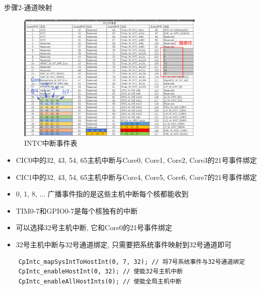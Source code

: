 \documentclass[10pt]{ctexbeamer}
\begin{document}
    \begin{frame}{步骤2-通道映射}
        \begin{figure}
        \centering
            \includegraphics[width=0.8\textwidth]{summary/5.eps}
            \caption{INTC中断事件表}
        \end{figure}
        \newpage
        \begin{itemize}
            \setlength{\itemsep}{0.3cm}
            \item CIC0中的32, 43, 54, 65主机中断与Core0, Core1, Core2, Core3的21号事件绑定
            \item CIC1中的32, 43, 54, 65主机中断与Core4, Core5, Core6, Core7的21号事件绑定
            \item 0, 1, 8, ... 广播事件指的是这些主机中断每个核都能收到
            \item TIM0-7和GPIO0-7是每个核独有的中断
            \item 可以选择32号主机中断, 它和Core0的21号事件绑定
            \item 32号主机中断与32号通道绑定, 只需要把系统事件映射到32号通道即可
        \end{itemize}

        \scriptsize
        \begin{verbatim}
    CpIntc_mapSysIntToHostInt(0, 7, 32); // 将7号系统事件与32号通道绑定
    CpIntc_enableHostInt(0, 32); // 使能32号主机中断
    CpIntc_enableAllHostInts(0); // 使能全局主机中断
        \end{verbatim}
    \end{frame}
\end{document}
